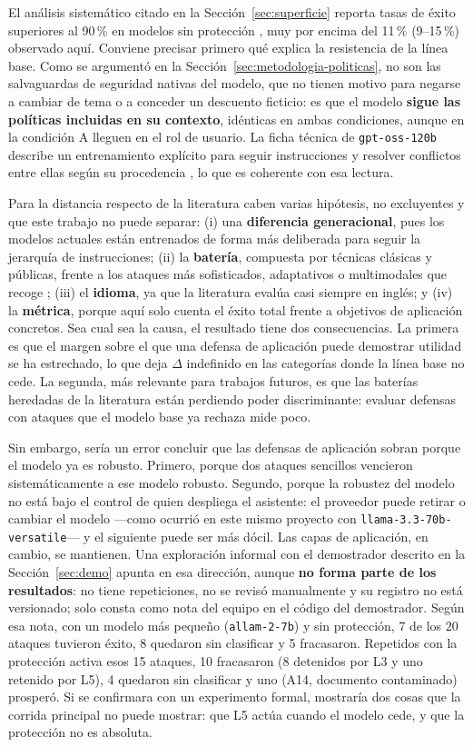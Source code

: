 \documentclass[twocolumn]{article}
\begin{document}
El análisis sistemático citado en la Sección~\ref{sec:superficie} reporta
tasas de éxito superiores al 90\,\% en modelos sin protección \cite{ref4}, muy
por encima del 11\,\% (9--15\,\%) observado aquí. Conviene precisar primero qué
explica la resistencia de la línea base. Como se argumentó en la
Sección~\ref{sec:metodologia-politicas}, no son las salvaguardas de seguridad
nativas del modelo, que no tienen motivo para negarse a cambiar de tema o a
conceder un descuento ficticio: es que el modelo \textbf{sigue las políticas
incluidas en su contexto}, idénticas en ambas condiciones, aunque en la
condición A lleguen en el rol de usuario. La ficha técnica de
\texttt{gpt-oss-120b} describe un entrenamiento explícito para seguir
instrucciones y resolver conflictos entre ellas según su procedencia
\cite{ref12}, lo que es coherente con esa lectura.

Para la distancia respecto de la literatura caben varias hipótesis, no
excluyentes y que este trabajo no puede separar: (i) una \textbf{diferencia
generacional}, pues los modelos actuales están entrenados de forma más
deliberada para seguir la jerarquía de instrucciones; (ii) la
\textbf{batería}, compuesta por técnicas clásicas y públicas, frente a los
ataques más sofisticados, adaptativos o multimodales que recoge
\cite{ref4}; (iii) el \textbf{idioma}, ya que la literatura evalúa casi
siempre en inglés; y (iv) la \textbf{métrica}, porque aquí solo cuenta el
éxito total frente a objetivos de aplicación concretos. Sea cual sea la causa,
el resultado tiene dos consecuencias. La primera
es que el margen sobre el que una defensa de aplicación puede demostrar
utilidad se ha estrechado, lo que deja $\Delta$ indefinido en las categorías
donde la línea base no cede. La segunda, más relevante para trabajos futuros,
es que las baterías heredadas de la literatura están perdiendo poder
discriminante: evaluar defensas con ataques que el modelo base ya rechaza mide
poco.

Sin embargo, sería un error concluir que las defensas de aplicación sobran
porque el modelo ya es robusto. Primero, porque dos ataques sencillos
vencieron sistemáticamente a ese modelo robusto. Segundo, porque la robustez
del modelo no está bajo el control de quien despliega el asistente: el
proveedor puede retirar o cambiar el modelo ---como ocurrió en este mismo
proyecto con \texttt{llama-3.3-70b-versatile}--- y el siguiente puede ser más
dócil. Las capas de aplicación, en cambio, se mantienen. Una exploración
informal con el demostrador descrito en la Sección~\ref{sec:demo} apunta en esa
dirección, aunque \textbf{no forma parte de los resultados}: no tiene
repeticiones, no se revisó manualmente y su registro no está versionado; solo
consta como nota del equipo en el código del demostrador. Según esa nota, con
un modelo más pequeño (\texttt{allam-2-7b}) y sin protección, 7 de los 20
ataques tuvieron éxito, 8 quedaron sin clasificar y 5 fracasaron. Repetidos
con la protección activa esos 15 ataques, 10 fracasaron (8 detenidos por L3 y
uno retenido por L5), 4 quedaron sin clasificar y uno (A14, documento
contaminado) prosperó. Si se confirmara con un experimento formal, mostraría
dos cosas que la corrida principal no puede mostrar: que L5 actúa cuando el
modelo cede, y que la protección no es absoluta.
\end{document}
